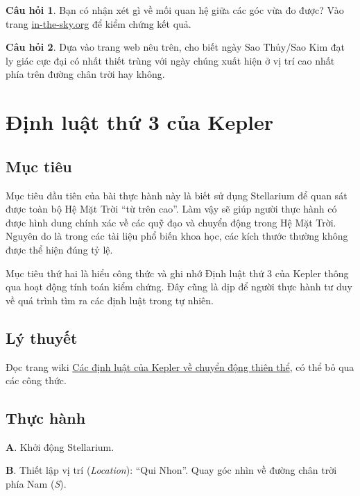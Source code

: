 \documentclass[
  a4paper,
]{book}
\begin{document}
\textbf{Câu hỏi 1}. Bạn có nhận xét gì về mối quan hệ giữa các góc vừa đo được? Vào trang \href{https://in-the-sky.org/newsindex.php?feed=innerplanets&year=2024&month=3&day=10&town=1568574}{in-the-sky.org} để kiểm chứng kết quả.

\textbf{Câu hỏi 2}. Dựa vào trang web nêu trên, cho biết ngày Sao Thủy/Sao Kim đạt ly giác cực đại có nhất thiết trùng với ngày chúng xuất hiện ở vị trí cao nhất phía trên đường chân trời hay không.

\chapter{Định luật thứ 3 của Kepler}\label{ux111ux1ecbnh-luux1eadt-thux1ee9-3-cux1ee7a-kepler}

\section{Mục tiêu}\label{mux1ee5c-tiuxeau-3}

Mục tiêu đầu tiên của bài thực hành này là biết sử dụng Stellarium để quan sát được toàn bộ Hệ Mặt Trời ``từ trên cao''. Làm vậy sẽ giúp người thực hành có được hình dung chính xác về các quỹ đạo và chuyển động trong Hệ Mặt Trời. Nguyên do là trong các tài liệu phổ biến khoa học, các kích thước thường không được thể hiện đúng tỷ lệ.

Mục tiêu thứ hai là hiểu công thức và ghi nhớ Định luật thứ 3 của Kepler thông qua hoạt động tính toán kiểm chứng. Đây cũng là dịp để người thực hành tư duy về quá trình tìm ra các định luật trong tự nhiên.

\section{Lý thuyết}\label{luxfd-thuyux1ebft-2}

Đọc trang wiki \href{https://vi.wikipedia.org/wiki/C\%C3\%A1c_\%C4\%91\%E1\%BB\%8Bnh_lu\%E1\%BA\%ADt_Kepler_v\%E1\%BB\%81_chuy\%E1\%BB\%83n_\%C4\%91\%E1\%BB\%99ng_thi\%C3\%AAn_th\%E1\%BB\%83}{Các định luật của Kepler về chuyển động thiên thể}, có thể bỏ qua các công thức.

\section{Thực hành}\label{thux1ef1c-huxe0nh-3}

\textbf{A}. Khởi động Stellarium.

\textbf{B}. Thiết lập vị trí (\emph{Location}): ``Qui Nhon''. Quay góc nhìn về đường chân trời phía Nam (\emph{S}).
\end{document}
